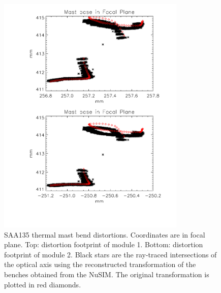 \begin{figure}[tb]
\begin{center}
\includegraphics[width=0.8\textwidth]{images/saa135mastbend2.pdf}
\caption{SAA135 thermal mast bend distortions. Coordinates are in focal plane. Top: distortion footprint of module 1. Bottom: distortion footprint of module 2. Black stars are the ray-traced intersections of the optical axis using the reconstructed transformation of the benches obtained from the NuSIM. The original transformation is plotted in red diamonds.}
\label{saa135re}
\end{center}
\end{figure}

